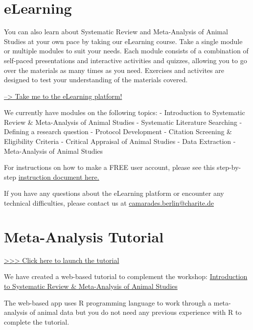 \documentclass[
]{book}
\begin{document}
\section{eLearning}\label{elearning}

You can also learn about Systematic Review and Meta-Analysis of Animal Studies at your own pace by taking our eLearning course. Take a single module or multiple modules to suit your needs. Each module consists of a combination of self-paced presentations and interactive activities and quizzes, allowing you to go over the materials as many times as you need. Exercises and activites are designed to test your understanding of the materials covered.

\href{https://courses.bihealth.org}{--\textgreater{} Take me to the eLearning platform!}

We currently have modules on the following topics:
- Introduction to Systematic Review \& Meta-Analysis of Animal Studies
- Systematic Literature Searching
- Defining a research question
- Protocol Development
- Citation Screening \& Eligibility Criteria
- Critical Appraisal of Animal Studies
- Data Extraction
- Meta-Analysis of Animal Studies

For instructions on how to make a FREE user account, please see this step-by-step \href{eLearning_course_account_guide.pdf}{instruction document here.}

If you have any questions about the eLearning platform or encounter any technical difficulties, please contact us at \href{mailto:CAMARADES.berlin@charite.de}{camarades.berlin@charite.de}

\section{Meta-Analysis Tutorial}\label{meta-analysis-tutorial}

\href{https://camarades.shinyapps.io/R-MA-Tutorial/}{\textgreater\textgreater\textgreater{} Click here to launch the tutorial}

We have created a web-based tutorial to complement the workshop: \href{https://www.bihealth.org/en/translation/innovation-enabler/quest-center/events/course/introduction-to-systematic-review-meta-analysis-of-animal-studies}{Introduction to Systematic Review \& Meta-Analysis of Animal Studies}

The web-based app uses R programming language to work through a meta-analysis of animal data but you do not need any previous experience with R to complete the tutorial.
\end{document}
